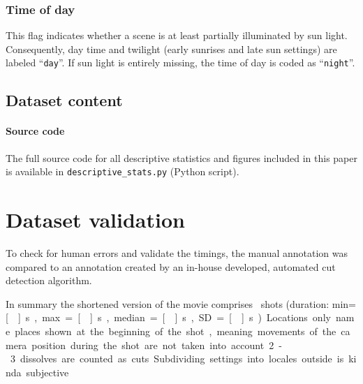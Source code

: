 \documentclass[10pt,a4paper,twocolumn]{article}
\begin{document}
\subsubsection*{Time of day}

This flag indicates whether a scene is at least partially illuminated by sun
light. Consequently, day time and twilight (early sunrises and late sun
settings) are labeled ``\texttt{day}''. If sun light is entirely missing,
the time of day is coded as ``\texttt{night}''.



\subsection*{Dataset content}


\paragraph{Source code}

The full source code for all descriptive statistics and figures included in
this paper is available in \texttt{descriptive\_stats.py} (Python script).


\section*{Dataset validation}

To check for human errors and validate the timings, the manual annotation was
compared to an annotation created by an in-house developed, automated cut
detection algorithm.

In summary the shortened version of the movie comprises
\NShots\ shots (duration: min=\unit[\ShotLengthMin]{s},
max=\unit[\ShotLengthMax]{s}, median=\unit[\ShotLengthMedian]{s},
SD=\unit[\ShotLengthSD]{s}).



Locations only name places shown at the beginning of the shot, meaning 
movements of the camera position during the shot are not taken into account.
2-3 dissolves are counted as cuts
Subdividing settings into locales outside is kinda subjective 
\end{document}
